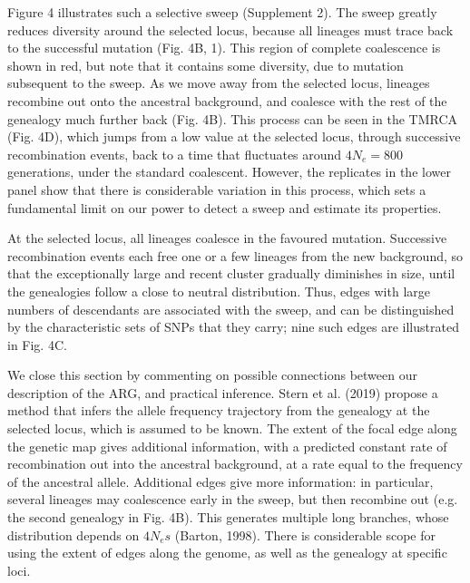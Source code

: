 \documentclass[twocolumn]{bmcart}%
\begin{document}
Figure 4 illustrates such a selective sweep (Supplement 2). The sweep greatly reduces diversity around the selected locus, because all lineages must trace back to the successful mutation (Fig. 4B, 1). This region of complete coalescence is shown in red, but note that it contains some diversity, due to mutation subsequent to the sweep. As we move away from the selected locus, lineages recombine out onto the ancestral background, and coalesce with the rest of the genealogy much further back (Fig. 4B).  This process can be seen in the TMRCA (Fig. 4D), which jumps from a low value at the selected locus, through successive recombination events, back to a time that fluctuates around $4N_e=800$ generations, under the standard coalescent. However, the replicates in the lower panel show that there is considerable variation in this process, which sets a fundamental limit on our power to detect a sweep and estimate its properties.

At the selected locus, all lineages coalesce in the favoured mutation. Successive recombination events each free one or a few lineages from the new background, so that the exceptionally large and recent cluster gradually diminishes in size, until the genealogies follow a close to neutral distribution. Thus, edges with large numbers of descendants are associated with the sweep, and can be distinguished by the characteristic sets of SNPs that they carry; nine such edges are illustrated in Fig. 4C. 

We close this section by commenting on possible connections between our description of the ARG, and practical inference. Stern et al. (2019) propose a method that infers the allele frequency trajectory from the genealogy at the selected locus, which is assumed to be known.  The extent of the focal edge along the genetic map gives additional information, with a predicted constant rate of recombination out into the ancestral background, at a rate equal to the frequency of the ancestral allele.  Additional edges give more information: in particular, several lineages may coalescence early in the sweep, but then recombine out (e.g. the second genealogy in Fig. 4B). This generates multiple long branches, whose distribution depends on $4N_es$ (Barton, 1998).  There is considerable scope for using the extent of edges along the genome, as well as the genealogy at specific loci.
\end{document}
